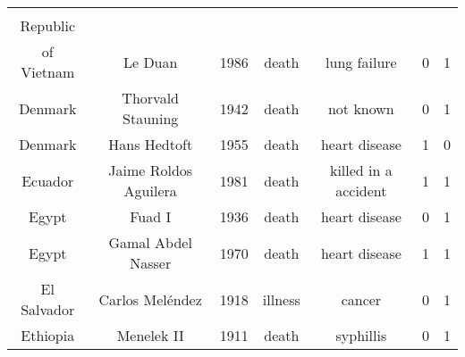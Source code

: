 \begin{center}
\begin{longtable}{ccccccc}
\begin{tabular}[c]{@{}c@{}}Democratic\\ Republic\\ of Vietnam\end{tabular} & Le Duan                                                                               & 1986       & death         & lung failure                                                           & 0        & 1       \\
Denmark                                                                    & Thorvald Stauning                                                                     & 1942       & death         & not known                                                              & 0        & 1       \\
Denmark                                                                    & Hans Hedtoft                                                                          & 1955       & death         & heart disease                                                          & 1        & 0       \\
Ecuador                                                                    & Jaime Roldos Aguilera                                                                 & 1981       & death         & killed in a accident                                                   & 1        & 1       \\
Egypt                                                                      & Fuad I                                                                                & 1936       & death         & heart disease                                                          & 0        & 1       \\
Egypt                                                                      & Gamal Abdel Nasser                                                                    & 1970       & death         & heart disease                                                          & 1        & 1       \\
El Salvador                                                                & Carlos Meléndez                                                                       & 1918       & illness       & cancer                                                                 & 0        & 1       \\
Ethiopia                                                                   & Menelek II                                                                            & 1911       & death         & syphillis                                                              & 0        & 1       \\

\end{longtable}
\end{center}
